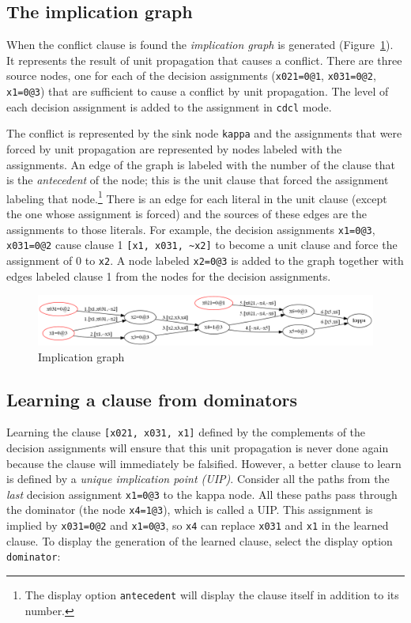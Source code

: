 \documentclass[11pt]{report}
\newcommand*{\p}[1]{\textup{\texttt{#1}}}
\begin{document}
\subsection{The implication graph}

When the conflict clause is found the \emph{implication graph} is
generated (Figure~\ref{fig.graph}). It represents the result of unit
propagation that causes a conflict. There are three source nodes, one
for each of the decision assignments (\p{x021=0@1}, \p{x031=0@2},
\p{x1=0@3}) that are sufficient to cause a conflict by unit propagation.
The level of each decision assignment is added to the assignment in
\p{cdcl} mode.

The conflict is represented by the sink node \p{kappa} and the
assignments that were forced by unit propagation are represented by
nodes labeled with the assignments. An edge of the graph is labeled with
the number of the clause that is the \emph{antecedent} of the node; this
is the unit clause that forced the assignment labeling that
node.\footnote{The display option \p{antecedent} will display the clause
itself in addition to its number.} There is an edge for each literal in
the unit clause (except the one whose assignment is forced) and the
sources of these edges are the assignments to those literals. For
example, the decision assignments \p{x1=0@3}, \p{x031=0@2}
cause clause 1 \verb+[x1, x031, ~x2]+ to become a unit clause
and force the assignment of 0 to \p{x2}. A node labeled \p{x2=0@3} is
added to the graph together with edges labeled clause 1 from the
nodes for the decision assignments.

\begin{figure}
\begin{center}
\includegraphics[keepaspectratio=true,width=\textwidth]{graph}
\end{center}
\caption{Implication graph}\label{fig.graph}
\end{figure}

\subsection{Learning a clause from dominators}

Learning the clause \p{[x021, x031, x1]} defined by the complements of
the decision assignments will ensure that this unit propagation is never
done again because the clause will immediately be falsified. However, a
better clause to learn is defined by a \emph{unique implication point
(UIP)}. Consider all the paths from the \emph{last} decision assignment
\p{x1=0@3} to the kappa node. All these paths pass through the dominator
(the node \p{x4=1@3}), which is called a UIP. This assignment is implied
by \p{x031=0@2} and \p{x1=0@3}, so \p{x4} can replace \p{x031} and
\p{x1} in the learned clause. To display the generation of the learned
clause, select the display option \p{dominator}:
\end{document}
